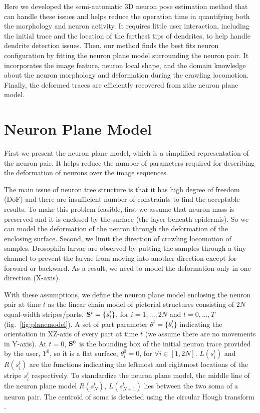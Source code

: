 \documentclass{article}
\begin{document}
Here we developed the semi-automatic 3D neuron pose estimation method that can handle these issues and helps reduce the operation time in quantifying both the morphology and neuron activity. It requires little user interaction, including the initial trace and the location of the farthest tips of dendrites, to help handle dendrite detection issues. Then, our method finds the best fits neuron configuration by fitting the neuron plane model surrounding the neuron pair. It incorporates the image feature, neuron local shape, and the domain knowledge about the neuron morphology and deformation during the crawling locomotion. Finally, the deformed traces are efficiently recovered from zthe neuron plane model.


\section{Neuron Plane Model}
First we present the neuron plane model, which is a simplified representation of the neuron pair. It helps reduce the number of parameters required for describing the deformation of neurons over the image sequences. 

The main issue of neuron tree structure is that it has high degree of freedom (DoF) and there are insufficient number of constraints to find the acceptable results. To make this problem feasible, first we assume that neuron mass is preserved and it is enclosed by the surface (the layer beneath epidermis). So we can model the deformation of the neuron through the deformation of the enclosing surface.
Second, we limit the direction of crawling locomotion of samples. Drosophila larvae are observed by putting the samples through a tiny channel to prevent the larvae from moving into another direction except for forward or backward. As a result, we need to model the deformation only in one direction (X-axis).

With these assumptions, we define the neuron plane model enclosing the neuron pair at time $t$ as the linear chain model of pictorial structures \cite{Felzenszwalb2005} consisting of $2N$ equal-width stripes/parts, ${\bf S}^t = \{s_i^t\}$, for $i = 1,...,2N$ and $t = 0,...,T$ (fig.~\ref{fig:planemodel}). A set of part parameter $\theta^t = \{\theta_i^t\}$ indicating the orientation in XZ-axis of every part at time $t$ (we assume there are no movements in Y-axis). At $t=0$, ${\bf S}^0$ is the bounding box of the initial neuron trace provided by the user, $Y^0$, so it is a flat surface, $\theta_i^0 = 0$, for $\forall i \in [1, 2N]$. $L(s_i^t)$ and $R(s_i^t)$ are the functions indicating the leftmost and rightmost locations of the stripe $s_i^t$ respectively. To standardize the neuron plane model, the middle line of the neuron plane model $R(s_N^t)$, $L(s_{N+1}^t)$ lies between the two soma of a neuron pair. The centroid of soma is detected using the circular Hough transform \cite{Duda1972}.
\end{document}
